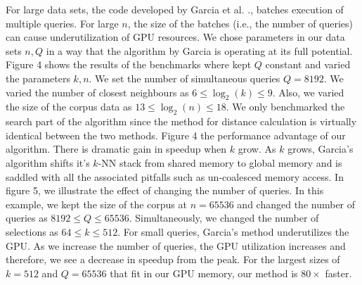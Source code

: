 \documentclass[10pt]{article}
\begin{document}
For large data sets, the code developed by Garcia et al. \cite{Garcia2010}., batches execution of multiple queries. For large $n$, the size of the batches (i.e., the number of queries) can cause underutilization of GPU resources. We chose parameters in our data sets $n,Q$ in a way that the algorithm by Garcia is operating at its full potential. Figure 4 shows the results of the benchmarks where kept $Q$ constant and varied the parameters $k,n$. We set the number of simultaneous queries $Q = 8192$. We varied the number of closest neighbours as $6 \le \log_2(k) \le 9$. Also, we varied the size of the corpus data as $13 \le \log_2(n) \le 18$. We only benchmarked the search part of the algorithm since the method for distance calculation is virtually identical between the two methods.  Figure 4 the performance advantage of our algorithm. There is dramatic gain in speedup when $k$ grow. As  $k$ grows, Garcia's algorithm shifts it's $k$-NN stack from shared memory to global memory and is saddled with all the associated pitfalls such as un-coalesced memory access.  In figure 5,  we illustrate the effect of changing the number of queries. In this example, we kept the size of the corpus at $n=65536$ and changed the number of queries as $8192 \le Q \le 65536$. Simultaneously, we changed the number of selections as $64 \le k \le 512$. For small queries, Garcia's method underutilizes the GPU.  As we increase the number of queries, the GPU utilization increases and therefore, we see a decrease in speedup from the peak. For the largest sizes of $k = 512$ and $Q = 65536$ that fit in our GPU memory, our method is $80 \times$ faster. \\
\end{document}
